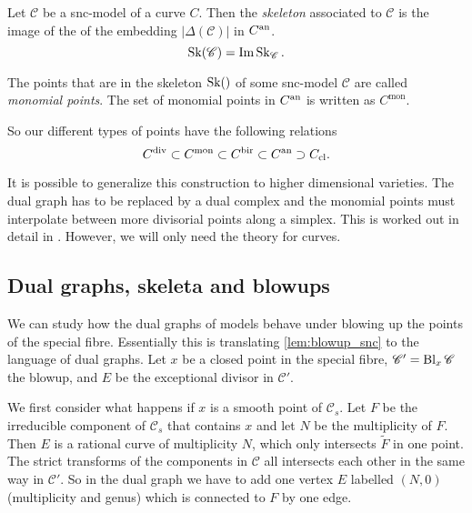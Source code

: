 \begin{definition}
	Let $\mathscr C$ be a snc-model of a curve $C$. 
	Then the \emph{skeleton} associated to $\mathscr C$ is the image of the of the embedding $|\Delta(\mathscr C)|$ in $C{}^{\text{an}}$. 
	\[
		\operatorname{Sk}(\mathscr C) = \operatorname{Im} \operatorname{Sk}_{\mathscr C}
	.\] 
\end{definition}
\begin{definition}
	The points that are in the skeleton $\operatorname{Sk}(\mathscr)$ of some snc-model $\mathscr C$ are called \emph{monomial points}. 
	The set of monomial points in $C{}^{\text{an}}$ is written as  $C^{\text{mon}}$. 
\end{definition}

So our different types of points have the following relations \[
C^{\text{div}} \subset C^{\text{mon}} \subset C{}^{\text{bir}} \subset C{}^{\text{an}} \supset C_\text{cl}
.\] 

\begin{remark}
	It is possible to generalize this construction to higher dimensional varieties. 
	The dual graph has to be replaced by a dual complex and the monomial points must interpolate between more divisorial points along a simplex.
	This is worked out in detail in \cite{mustataWeightFunctionsNonArchimedean2015}. 
	However, we will only need the theory for curves. 
\end{remark}


\subsection{Dual graphs, skeleta and blowups} \label{sec:dual_graphs_and_blowups}
We can study how the dual graphs of models behave under blowing up the points of the special fibre.
Essentially this is translating \cref{lem:blowup_snc} to the language of dual graphs.
Let $x$ be a closed point in the special fibre, $\mathscr C' = \operatorname{Bl}_{x} \mathscr C$ the blowup, and $E$ be the exceptional divisor in $\mathscr C'$.

We first consider what happens if $x $ is a smooth point of $\mathscr C_s$. 
Let $F$ be the irreducible component of $\mathscr C_s$ that contains $x$ and let $N$ be the multiplicity of $F$. 
Then $E$ is a rational curve of multiplicity $N$, which only intersects $\tilde F$ in one point. 
The strict transforms of the components in $\mathscr C$ all intersects each other in the same way in $\mathscr C'$. 
So in the dual graph we have to add one vertex $E$ labelled $(N, 0)$ (multiplicity and genus) which is connected to $F$ by one edge.

